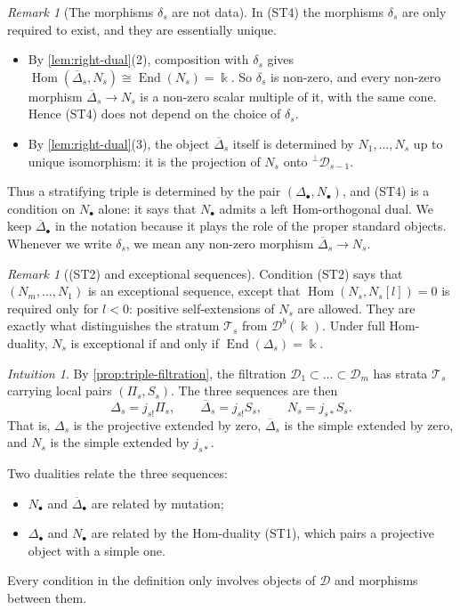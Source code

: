 \documentclass[11pt,reqno]{amsart}
\theoremstyle{plain}
\theoremstyle{definition}
\theoremstyle{remark}
\newtheorem{remark}[theorem]{Remark}
\newtheorem*{intuition}{Intuition}
\newcommand{\kk}{\Bbbk}
\DeclareMathOperator{\Hom}{Hom}
\DeclareMathOperator{\End}{End}
\newcommand{\Db}{\mathcal{D}^b}
\newcommand{\Deltabar}{\overline{\Delta}}
\newcommand{\cD}{\mathcal{D}}
\newcommand{\cT}{\mathcal{T}}
\begin{document}
\begin{remark}[The morphisms $\delta_s$ are not data]\label{rem:delta-not-data}
In (ST4) the morphisms $\delta_s$ are only required to exist, and they are essentially unique.
\begin{itemize}
\item By \cref{lem:right-dual}(2), composition with $\delta_s$ gives $\Hom(\Deltabar_s,N_s)\cong\End(N_s)=\kk$. So $\delta_s$ is non-zero, and every non-zero morphism $\Deltabar_s\to N_s$ is a non-zero scalar multiple of it, with the same cone. Hence (ST4) does not depend on the choice of $\delta_s$.
\item By \cref{lem:right-dual}(3), the object $\Deltabar_s$ itself is determined by $N_1,\dots,N_s$ up to unique isomorphism: it is the projection of $N_s$ onto ${}^\perp\cD_{s-1}$.
\end{itemize}
Thus a stratifying triple is determined by the pair $(\Delta_\bullet,N_\bullet)$, and (ST4) is a condition on $N_\bullet$ alone: it says that $N_\bullet$ admits a left Hom-orthogonal dual. We keep $\Deltabar_\bullet$ in the notation because it plays the role of the proper standard objects. Whenever we write $\delta_s$, we mean any non-zero morphism $\Deltabar_s\to N_s$.
\end{remark}

\begin{remark}[(ST2) and exceptional sequences]\label{rem:ST2}
Condition (ST2) says that $(N_m,\dots,N_1)$ is an exceptional sequence, except that $\Hom(N_s,N_s[l])=0$ is required only for $l<0$: positive self-extensions of $N_s$ are allowed. They are exactly what distinguishes the stratum $\cT_s$ from $\Db(\kk)$. Under full Hom-duality, $N_s$ is exceptional if and only if $\End(\Delta_s)=\kk$.
\end{remark}

\begin{intuition}
By \cref{prop:triple-filtration}, the filtration $\cD_1\subset\dots\subset\cD_m$ has strata $\cT_s$ carrying local pairs $(\Pi_s,S_s)$. The three sequences are then
\[\Delta_s=j_{s!}\Pi_s,\qquad\Deltabar_s=j_{s!}S_s,\qquad N_s=j_{s*}S_s.\]
That is, $\Delta_s$ is the projective extended by zero, $\Deltabar_s$ is the simple extended by zero, and $N_s$ is the simple extended by $j_{s*}$.

Two dualities relate the three sequences:
\begin{itemize}
\item $N_\bullet$ and $\Deltabar_\bullet$ are related by mutation;
\item $\Delta_\bullet$ and $N_\bullet$ are related by the Hom-duality (ST1), which pairs a projective object with a simple one.
\end{itemize}
Every condition in the definition only involves objects of $\cD$ and morphisms between them.
\end{intuition}
\end{document}
